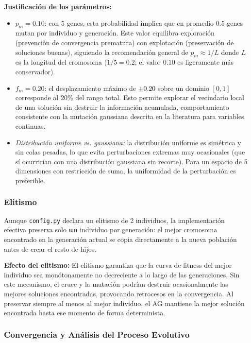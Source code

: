\documentclass[11pt]{article}
\begin{document}
\textbf{Justificación de los parámetros:}
\begin{itemize}
    \item $p_m = 0.10$: con 5 genes, esta probabilidad implica que en promedio 0.5 genes mutan por individuo y generación. Este valor equilibra exploración (prevención de convergencia prematura) con explotación (preservación de soluciones buenas), siguiendo la recomendación general de $p_m \approx 1/L$ donde $L$ es la longitud del cromosoma ($1/5 = 0.2$; el valor $0.10$ es ligeramente más conservador).
    \item $f_m = 0.20$: el desplazamiento máximo de $\pm 0.20$ sobre un dominio $[0,1]$ corresponde al 20\% del rango total. Esto permite explorar el vecindario local de una solución sin destruir la información acumulada, comportamiento consistente con la mutación gaussiana descrita en la literatura \cite{b2} para variables continuas.
    \item \textit{Distribución uniforme vs. gaussiana:} la distribución uniforme es simétrica y sin colas pesadas, lo que evita perturbaciones extremas muy ocasionales (que sí ocurrirían con una distribución gaussiana sin recorte). Para un espacio de 5 dimensiones con restricción de suma, la uniformidad de la perturbación es preferible.
\end{itemize}

\subsubsection{Elitismo}

Aunque \texttt{config.py} declara un elitismo de 2 individuos, la implementación efectiva preserva solo \textbf{un} individuo por generación: el mejor cromosoma encontrado en la generación actual se copia directamente a la nueva población antes de crear el resto de hijos.

\textbf{Efecto del elitismo:} El elitismo garantiza que la curva de fitness del mejor individuo sea monótonamente no decreciente a lo largo de las generaciones. Sin este mecanismo, el cruce y la mutación podrían destruir ocasionalmente las mejores soluciones encontradas, provocando retrocesos en la convergencia. Al preservar siempre al menos al mejor individuo, el AG mantiene la mejor solución encontrada hasta ese momento de forma determinista.

\subsubsection{Convergencia y Análisis del Proceso Evolutivo}
\end{document}
